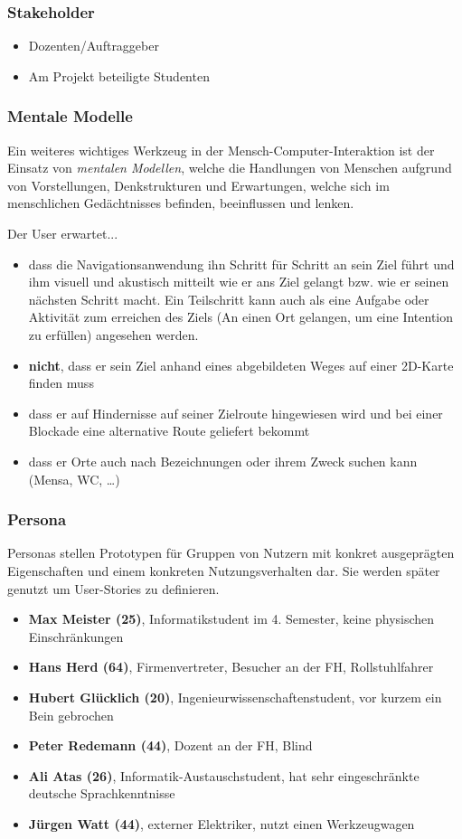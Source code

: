 \subsubsection*{Stakeholder}
\begin{itemize}
  \item Dozenten/Auftraggeber
  \item Am Projekt beteiligte Studenten
\end{itemize}

\subsubsection*{Mentale Modelle}
Ein weiteres wichtiges Werkzeug in der Mensch-\-Computer-\-Interaktion ist der Einsatz von \emph{mentalen Modellen}, welche die Handlungen von Menschen aufgrund von Vorstellungen, Denkstrukturen und Erwartungen, welche sich im menschlichen Gedächtnisses befinden, beeinflussen und lenken.\medskip

\noindent Der User erwartet...
\begin{itemize}
  \item dass die Navigationsanwendung ihn Schritt für Schritt an sein Ziel führt und ihm visuell und akustisch mitteilt wie er ans Ziel gelangt bzw. wie er seinen nächsten Schritt macht. Ein Teilschritt kann auch als eine Aufgabe oder Aktivität zum erreichen des Ziels (An einen Ort gelangen, um eine Intention zu erfüllen) angesehen werden.
  \item \textbf{nicht}, dass er sein Ziel anhand eines abgebildeten Weges auf einer 2D-Karte finden muss
  \item dass er auf Hindernisse auf seiner Zielroute hingewiesen wird und bei einer Blockade eine alternative Route geliefert bekommt
  \item dass er Orte auch nach Bezeichnungen oder ihrem Zweck suchen kann (Mensa, WC, \dots)
\end{itemize}

\subsubsection*{Persona}
Personas stellen Prototypen für Gruppen von Nutzern mit konkret ausgeprägten Eigenschaften und einem konkreten Nutzungsverhalten dar. Sie werden später genutzt um User-Stories zu definieren.

\begin{itemize}
  \item \textbf{Max Meister (25)}, Informatikstudent im 4. Semester, keine physischen Einschränkungen
  \item \textbf{Hans Herd (64)}, Firmenvertreter, Besucher an der FH, Rollstuhlfahrer
  \item \textbf{Hubert Glücklich (20)}, Ingenieurwissenschaftenstudent, vor kurzem ein Bein gebrochen
  \item \textbf{Peter Redemann (44)}, Dozent an der FH, Blind
  \item \textbf{Ali Atas (26)}, Informatik-Austauschstudent, hat sehr eingeschränkte deutsche Sprachkenntnisse
  \item \textbf{Jürgen Watt (44)}, externer Elektriker, nutzt einen Werkzeugwagen 
\end{itemize}

